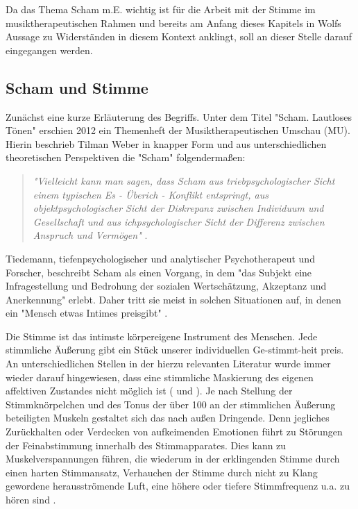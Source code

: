 Da das Thema Scham m.E. wichtig ist für die Arbeit mit der Stimme im musiktherapeutischen Rahmen und bereits am Anfang dieses Kapitels in Wolfs Aussage zu Widerständen in diesem Kontext anklingt, soll an dieser Stelle darauf eingegangen werden.

\subsection{Scham und Stimme}
Zunächst eine kurze Erläuterung des Begriffs. Unter dem Titel "Scham. Lautloses Tönen" erschien 2012 ein Themenheft der Musiktherapeutischen Umschau (MU). Hierin beschrieb Tilman Weber in knapper Form und aus unterschiedlichen theoretischen Perspektiven die "Scham" folgendermaßen:

\begin{quote}
\emph{"Vielleicht kann man sagen, dass Scham aus triebpsychologischer Sicht einem typischen Es - Überich - Konflikt entspringt, aus objektpsychologischer Sicht der Diskrepanz zwischen Individuum und Gesellschaft und aus ichpsychologischer Sicht der Differenz zwischen Anspruch und Vermögen"} \autocite[215]{weber2012}. 
\end{quote}

Tiedemann, tiefenpsychologischer und analytischer Psychotherapeut und Forscher, beschreibt Scham als einen Vorgang, in dem "das Subjekt eine Infragestellung und Bedrohung der sozialen Wertschätzung, Akzeptanz und Anerkennung" \autocite[219]{tiedemann2012} erlebt. Daher tritt sie meist in solchen Situationen auf, in denen ein "Mensch etwas Intimes preisgibt" \autocite[219]{tiedemann2012}. 

Die Stimme ist das intimste körpereigene Instrument des Menschen. Jede stimmliche Äußerung gibt ein Stück unserer individuellen Ge-stimmt-heit preis. An unterschiedlichen Stellen in der hierzu relevanten Literatur wurde immer wieder darauf hingewiesen, dass eine stimmliche Maskierung des eigenen affektiven Zustandes nicht möglich ist (\cite[vgl.][279]{deckervoigt2000} und \cite[vgl.][481]{rittner2009a}). Je nach Stellung der Stimmknörpelchen und des Tonus der über 100 an der stimmlichen Äußerung beteiligten Muskeln \autocite[vgl.][40]{cramer1998} gestaltet sich das nach außen Dringende. Denn jegliches Zurückhalten oder Verdecken von aufkeimenden Emotionen führt zu Störungen der Feinabstimmung innerhalb des Stimmapparates. Dies kann zu Muskelverspannungen führen, die wiederum in der erklingenden Stimme durch einen harten Stimmansatz, Verhauchen der Stimme durch nicht zu Klang gewordene herausströmende Luft, eine höhere oder tiefere Stimmfrequenz u.a. zu hören sind \autocite[vgl.][279]{deckervoigt2000}. 

